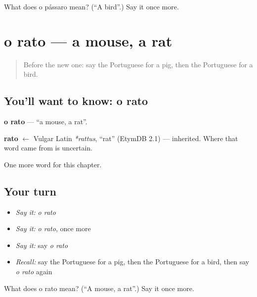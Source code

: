 \begin{tcolorbox}[breakable,colback=teal!4,colframe=teal!35!black,title={Before you move on}]
What does o pássaro mean? (\textquotedblleft{}A bird\textquotedblright{}.) Say it once more.
\end{tcolorbox}
\section[o rato]{o rato — a mouse, a rat}

\label{lesson:PT-C61-rato}



\begin{quote}
Before the new one: say the Portuguese for a pig, then the Portuguese for a bird.
\end{quote}

\subsection*{You'll want to know: o rato}
\textbf{o rato} — \textquotedblleft{}a mouse, a rat\textquotedblright{}.

\begin{cousinweb}
\textbf{rato} $\leftarrow$ Vulgar Latin \emph{*rattus}, \textquotedblleft{}rat\textquotedblright{} (EtymDB 2.1) — inherited. Where that word came from is uncertain.
\end{cousinweb}

\begin{grammarlens}[title={What you've built}]
One more word for this chapter.
\end{grammarlens}

\subsection*{Your turn}
\begin{itemize}
\raggedright
  \item \emph{Say it:} \emph{o rato}
  \item \emph{Say it:} \emph{o rato}, once more
  \item \emph{Say it:} say \emph{o rato}
  \item \emph{Recall:} say the Portuguese for a pig, then the Portuguese for a bird, then say \emph{o rato} again
\end{itemize}

\begin{tcolorbox}[breakable,colback=teal!4,colframe=teal!35!black,title={Before you move on}]
What does o rato mean? (\textquotedblleft{}A mouse, a rat\textquotedblright{}.) Say it once more.
\end{tcolorbox}
